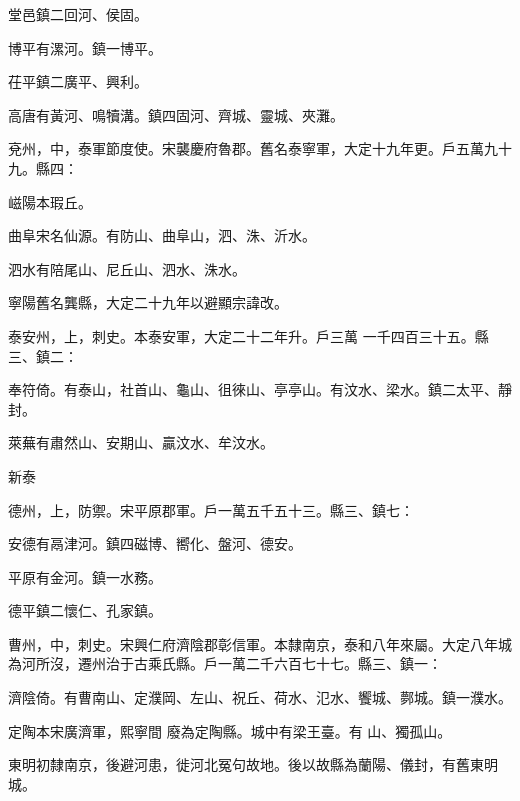\begin{pinyinscope}
 堂邑鎮二回河、侯固。



 博平有漯河。鎮一博平。



 茌平鎮二廣平、興利。



 高唐有黃河、鳴犢溝。鎮四固河、齊城、靈城、夾灘。



 兗州，中，泰軍節度使。宋襲慶府魯郡。舊名泰寧軍，大定十九年更。戶五萬九十九。縣四：



 嵫陽本瑕丘。



 曲阜宋名仙源。有防山、曲阜山，泗、洙、沂水。



 泗水有陪尾山、尼丘山、泗水、洙水。



 寧陽舊名龔縣，大定二十九年以避顯宗諱改。



 泰安州，上，刺史。本泰安軍，大定二十二年升。戶三萬
 一千四百三十五。縣三、鎮二：



 奉符倚。有泰山，社首山、龜山、徂徠山、亭亭山。有汶水、梁水。鎮二太平、靜封。



 萊蕪有肅然山、安期山、贏汶水、牟汶水。



 新泰



 德州，上，防禦。宋平原郡軍。戶一萬五千五十三。縣三、鎮七：



 安德有鬲津河。鎮四磁博、嚮化、盤河、德安。



 平原有金河。鎮一水務。



 德平鎮二懷仁、孔家鎮。



 曹州，中，刺史。宋興仁府濟陰郡彰信軍。本隸南京，泰和八年來屬。大定八年城為河所沒，遷州治于古乘氏縣。戶一萬二千六百七十七。縣三、鎮一：



 濟陰倚。有曹南山、定濮岡、左山、祝丘、荷水、氾水、饗城、鄸城。鎮一濮水。


定陶本宋廣濟軍，熙寧間
 廢為定陶縣。城中有梁王臺。有
 山、獨孤山。



 東明初隸南京，後避河患，徙河北冤句故地。後以故縣為蘭陽、儀封，有舊東明城。



\end{pinyinscope}